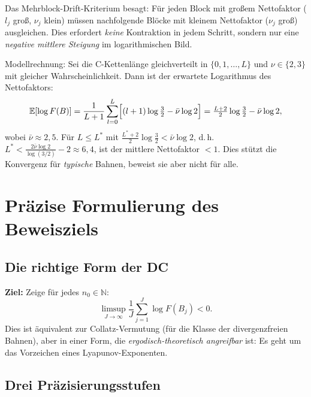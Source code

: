 \documentclass[12pt,a4paper]{article}
\newcommand{\N}{\mathbb{N}}
\begin{document}
Das Mehrblock-Drift-Kriterium besagt: Für jeden Block mit großem
Nettofaktor ($l_j$ groß, $\nu_j$ klein) müssen nachfolgende Blöcke
mit kleinem Nettofaktor ($\nu_j$ groß) ausgleichen. Dies erfordert
\emph{keine} Kontraktion in jedem Schritt, sondern nur eine
\emph{negative mittlere Steigung} im logarithmischen Bild.

\begin{tcolorbox}[lte, title={Mittlerer Nettofaktor nach LTE}]
Modellrechnung: Sei die C-Kettenlänge gleichverteilt in
$\{0, 1, \ldots, L\}$ und $\nu \in \{2, 3\}$ mit gleicher Wahrscheinlichkeit.
Dann ist der erwartete Logarithmus des Nettofaktors:
\[
  \mathbb{E}[\log F(B)] = \frac{1}{L+1}\sum_{l=0}^{L} \Bigl[
    (l+1)\log\tfrac{3}{2} - \bar\nu \log 2
  \Bigr]
  = \tfrac{L+2}{2} \log\tfrac{3}{2} - \bar\nu\log 2,
\]
wobei $\bar\nu \approx 2{,}5$. Für $L \leq L^*$ mit
$\frac{L^*+2}{2}\log\frac{3}{2} < \bar\nu\log 2$, d.\,h.\
$L^* < \frac{2\bar\nu\log 2}{\log(3/2)} - 2 \approx 6{,}4$, ist der
mittlere Nettofaktor $< 1$. Dies stützt die Konvergenz für \emph{typische}
Bahnen, beweist sie aber nicht für alle.
\end{tcolorbox}

\section{Präzise Formulierung des Beweisziels}
\label{sec:beweisziel}

\subsection{Die richtige Form der DC}

\begin{tcolorbox}[kernidee, title={Mehrblock-DC (richtige Form)}]
\textbf{Ziel:} Zeige für jedes $n_0 \in \N$:
\[
  \limsup_{J\to\infty} \frac{1}{J} \sum_{j=1}^{J} \log F(B_j) < 0.
\]
Dies ist äquivalent zur Collatz-Vermutung (für die Klasse der divergenzfreien
Bahnen), aber in einer Form, die \emph{ergodisch-theoretisch angreifbar} ist:
Es geht um das Vorzeichen eines Lyapunov-Exponenten.
\end{tcolorbox}

\subsection{Drei Präzisierungsstufen}
\end{document}
